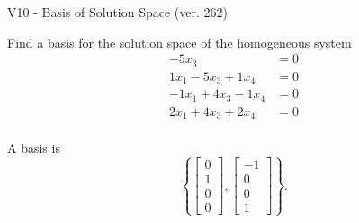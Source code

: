 \begin{exercise}
  \begin{exerciseTitle}V10 - Basis of Solution Space (ver. 262)\end{exerciseTitle}
  \begin{exerciseStatement}
    Find a basis for the solution space of the homogeneous system 
\begin{align*}
 -5 x_ 3 &= 0  \\ 
  1 x_ 1 -5 x_ 3 + 1 x_ 4 &= 0  \\ 
  -1 x_ 1 + 4 x_ 3 -1 x_ 4 &= 0  \\ 
  2 x_ 1 + 4 x_ 3 + 2 x_ 4 &= 0  \\ 
 \end{align*}


 
  \end{exerciseStatement}

  \begin{exerciseAnswer}
   A basis is   
\[\left\{\left[\begin{array}{c}
0 \\
1 \\
0 \\
0
\end{array}\right] , \left[\begin{array}{c}
-1 \\
0 \\
0 \\
1
\end{array}\right]\right\}.\]

  


  \end{exerciseAnswer}
\end{exercise}